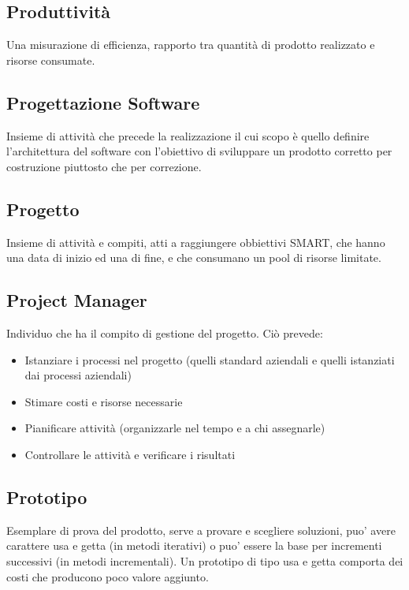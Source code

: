 	\subsection{Produttività}	
	\label{sec:produttivita}
	Una misurazione di efficienza, rapporto tra quantità di prodotto realizzato e risorse consumate.

	\subsection{Progettazione Software}
	\label{sec:progettazionesoftware}
	Insieme di attività che precede la realizzazione il cui scopo è quello definire l'architettura del software con l'obiettivo di sviluppare un prodotto corretto per costruzione piuttosto che per correzione.
	
	\subsection{Progetto}
	\label{sec:progetto}
	Insieme di attività e compiti, atti a raggiungere obbiettivi SMART, che hanno una data di inizio ed una di fine, e che consumano un pool di risorse limitate.	
	
	\subsection{Project Manager}
	\label{sec:projectmanager}
	Individuo che ha il compito di gestione del progetto. Ciò prevede:
	\begin{itemize}  
	\item Istanziare i processi nel progetto (quelli standard aziendali e quelli istanziati dai processi aziendali)
	\item Stimare costi e risorse necessarie
	\item Pianificare attività (organizzarle nel tempo e a chi assegnarle)
	\item Controllare le attività e verificare i risultati
	\end{itemize}	
		
	\subsection{Prototipo}
	\label{sec:prototipo}
	Esemplare di prova del prodotto, serve a provare e scegliere soluzioni, puo' avere carattere usa e getta (in metodi iterativi) 
	o puo' essere la base per incrementi successivi (in metodi incrementali).
	Un prototipo di tipo usa e getta comporta dei costi che producono poco valore aggiunto.\newpage	


